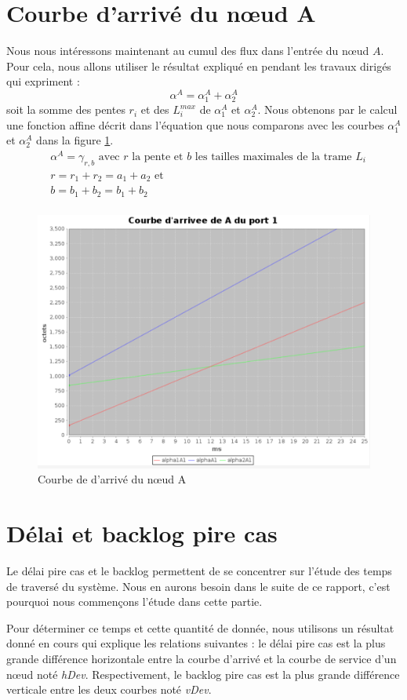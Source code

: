 \section{Courbe d'arrivé du nœud A}
Nous nous intéressons maintenant au cumul des flux dans l'entrée du nœud $A$. Pour cela, nous allons utiliser le résultat expliqué en pendant les travaux dirigés qui expriment : 
\begin{equation}
\alpha^A = \alpha_1^A + \alpha_2^A
\end{equation}
soit la somme des pentes $r_i$ et des $L_i^{max}$ de $\alpha_1^A$ et $\alpha_2^A$. Nous obtenons par le calcul une fonction affine décrit dans l'équation  que nous comparons avec les courbes $\alpha_1^A$ et $\alpha_2^A$ dans la figure \ref{fig:arriveA}.
\begin{align}\label{eqn:arriveA}
&\alpha^A = \gamma_{r,b} \text{ avec $r$ la pente et $b$ les tailles maximales de la trame $L_i$}\\
&r = r_1 + r_2 = a_1 + a_2\text{ et } \\
&b = b_1 + b_2 = b_1 + b_2\\
\end{align}
\begin{figure}[!ht]\label{fig:arriveA}
\centering
\includegraphics[width = .6\textwidth]{./I/images/arrive_general.png}
\caption{Courbe de d'arrivé du nœud A}
\end{figure} 

\section{Délai et backlog pire cas}
Le délai pire cas et le backlog permettent de se concentrer sur l'étude des temps de traversé du système. Nous en aurons besoin dans le suite de ce rapport, c'est pourquoi nous commençons l'étude dans cette partie.

Pour déterminer ce temps et cette quantité de donnée, nous utilisons un résultat donné en cours qui explique les relations suivantes : le délai pire cas est la plus grande différence horizontale entre la courbe d'arrivé et la courbe de service d'un nœud noté \emph{hDev}. Respectivement, le backlog pire cas est la plus grande différence verticale entre les deux courbes noté \emph{vDev}. 

